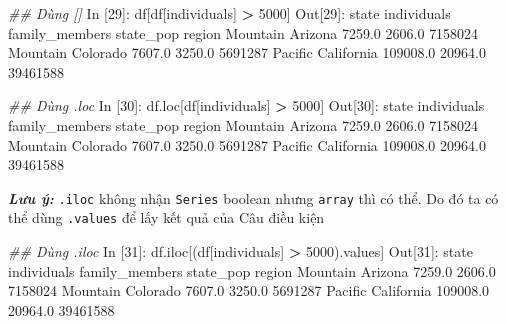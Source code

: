 \documentclass[
]{book}
\makeatletter
\newenvironment{Shaded}{\begin{snugshade}}{\end{snugshade}}
\newcommand{\CommentTok}[1]{\textcolor[rgb]{0.56,0.35,0.01}{\textit{#1}}}
\newcommand{\DecValTok}[1]{\textcolor[rgb]{0.00,0.00,0.81}{#1}}
\newcommand{\FloatTok}[1]{\textcolor[rgb]{0.00,0.00,0.81}{#1}}
\newcommand{\NormalTok}[1]{#1}
\newcommand{\OperatorTok}[1]{\textcolor[rgb]{0.81,0.36,0.00}{\textbf{#1}}}
\newcommand{\StringTok}[1]{\textcolor[rgb]{0.31,0.60,0.02}{#1}}
\newenvironment{kframe}{%
\medskip{}
\setlength{\fboxsep}{.8em}
 \def\at@end@of@kframe{}%
 \ifinner\ifhmode%
  \def\at@end@of@kframe{\end{minipage}}%
  \begin{minipage}{\columnwidth}%
 \fi\fi%
 \def\FrameCommand##1{\hskip\@totalleftmargin \hskip-\fboxsep
 \colorbox{shadecolor}{##1}\hskip-\fboxsep
     \hskip-\linewidth \hskip-\@totalleftmargin \hskip\columnwidth}%
 \MakeFramed {\advance\hsize-\width
   \@totalleftmargin\z@ \linewidth\hsize
   \@setminipage}}%
 {\par\unskip\endMakeFramed%
 \at@end@of@kframe}
\newenvironment{rmdblock}[1]
  {
  \begin{itemize}
  \renewcommand{\labelitemi}{
    \raisebox{-.7\height}[0pt][0pt]{
      {\setkeys{Gin}{width=3em,keepaspectratio}\texttt{[image: images/\#1]}}
    }
  }
  \setlength{\fboxsep}{1em}
  \begin{kframe}
  \item
  }
  {
  \end{kframe}
  \end{itemize}
  }
\newenvironment{rmdnote}
  {\begin{rmdblock}{note}}
  {\end{rmdblock}}
\makeatother
\begin{document}
\begin{Shaded}
\begin{Highlighting}[]
\CommentTok{\#\# Dùng []}
\NormalTok{In [}\DecValTok{29}\NormalTok{]: df[df[}\StringTok{\textquotesingle{}individuals\textquotesingle{}}\NormalTok{] }\OperatorTok{\textgreater{}} \DecValTok{5000}\NormalTok{]}
\NormalTok{Out[}\DecValTok{29}\NormalTok{]:}
\NormalTok{               state  individuals  family\_members  state\_pop}
\NormalTok{region                                                      }
\NormalTok{Mountain     Arizona       }\FloatTok{7259.0}          \FloatTok{2606.0}    \DecValTok{7158024}
\NormalTok{Mountain    Colorado       }\FloatTok{7607.0}          \FloatTok{3250.0}    \DecValTok{5691287}
\NormalTok{Pacific   California     }\FloatTok{109008.0}         \FloatTok{20964.0}   \DecValTok{39461588}

\CommentTok{\#\# Dùng .loc}
\NormalTok{In [}\DecValTok{30}\NormalTok{]: df.loc[df[}\StringTok{\textquotesingle{}individuals\textquotesingle{}}\NormalTok{] }\OperatorTok{\textgreater{}} \DecValTok{5000}\NormalTok{]}
\NormalTok{Out[}\DecValTok{30}\NormalTok{]: }
\NormalTok{               state  individuals  family\_members  state\_pop}
\NormalTok{region                                                      }
\NormalTok{Mountain     Arizona       }\FloatTok{7259.0}          \FloatTok{2606.0}    \DecValTok{7158024}
\NormalTok{Mountain    Colorado       }\FloatTok{7607.0}          \FloatTok{3250.0}    \DecValTok{5691287}
\NormalTok{Pacific   California     }\FloatTok{109008.0}         \FloatTok{20964.0}   \DecValTok{39461588}
\end{Highlighting}
\end{Shaded}

\begin{rmdnote}
\textbf{\emph{Lưu ý:}}
\texttt{.iloc} không nhận \texttt{Series} boolean nhưng \texttt{array} thì có thể. Do đó ta có thể dùng \texttt{.values} để lấy kết quả của Câu điều kiện
\end{rmdnote}

\begin{Shaded}
\begin{Highlighting}[]
\CommentTok{\#\# Dùng .iloc}
\NormalTok{In [}\DecValTok{31}\NormalTok{]: df.iloc[(df[}\StringTok{\textquotesingle{}individuals\textquotesingle{}}\NormalTok{] }\OperatorTok{\textgreater{}} \DecValTok{5000}\NormalTok{).values]}
\NormalTok{Out[}\DecValTok{31}\NormalTok{]:}
\NormalTok{               state  individuals  family\_members  state\_pop}
\NormalTok{region                                                      }
\NormalTok{Mountain     Arizona       }\FloatTok{7259.0}          \FloatTok{2606.0}    \DecValTok{7158024}
\NormalTok{Mountain    Colorado       }\FloatTok{7607.0}          \FloatTok{3250.0}    \DecValTok{5691287}
\NormalTok{Pacific   California     }\FloatTok{109008.0}         \FloatTok{20964.0}   \DecValTok{39461588}
\end{Highlighting}
\end{Shaded}
\end{document}
